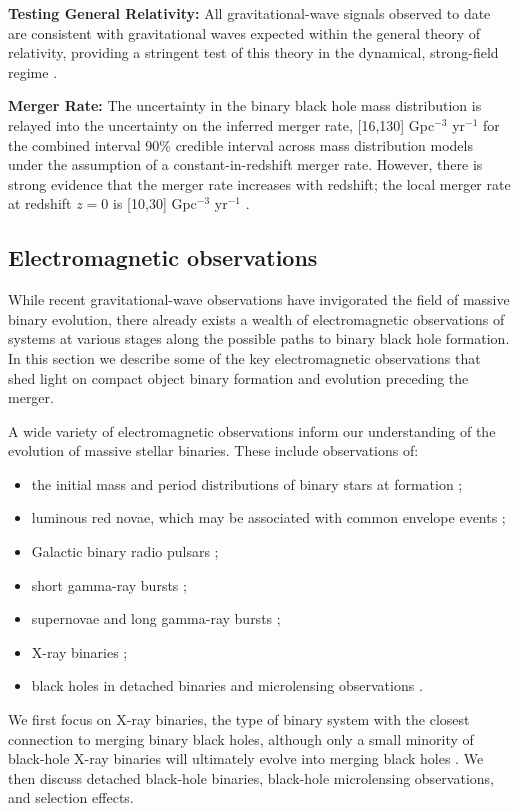 \documentclass[review]{elsarticle}
\begin{document}
\textbf{Testing General Relativity:} All gravitational-wave signals observed to date are consistent with gravitational waves expected within the general theory of relativity, providing a stringent test of this theory in the dynamical, strong-field regime \citep{GW150914:GR,GWTC2:GR}.

\textbf{Merger Rate:} The uncertainty in the binary black hole mass distribution is relayed into the uncertainty on the inferred merger rate, [16,130]  Gpc$^{-3}$ yr$^{-1}$ for the combined interval 90\% credible interval across mass distribution models under the assumption of a constant-in-redshift merger rate.  However, there is strong evidence that the merger rate increases with redshift; the local merger rate at redshift $z=0$ is [10,30]  Gpc$^{-3}$ yr$^{-1}$  \citep{GWTC3:pop}.  

\subsection{Electromagnetic observations}

While recent gravitational-wave observations have invigorated the field of massive binary evolution, there already exists a wealth of electromagnetic observations of systems at various stages along the possible paths to binary black hole formation. In this section we describe some of the key electromagnetic observations that shed light on compact object binary formation and evolution preceding the merger.

A wide variety of electromagnetic observations inform our understanding of the evolution of massive stellar binaries. These include observations of: 
\begin{itemize}
\item the initial mass and period distributions of binary stars at formation \citep[e.g.,][]{Sana:2012,MoeDiStefano:2017}; 
\item luminous red novae, which may be associated with common envelope events \citep[e.g.,][]{Ivanova:2013LRN,Howitt:2020};
\item Galactic binary radio pulsars \citep[e.g.,][]{Tauris:2017};
\item short gamma-ray bursts \citep[e.g.,][]{Berger:2014};
\item supernovae and long gamma-ray bursts \citep[e.g.,][]{Cantiello:2007,Szecsi:2017,Bavera:2021};
\item X-ray binaries \citep[e.g.,][]{TaurisvdH:2006,Fabbiano:2006};
\item black holes in detached binaries \citep[e.g.,][]{Thompson:2019} and microlensing observations \citep[e.g.,][]{WyrzykowskiMandel:2019}.
\end{itemize}
We first focus on X-ray binaries, the type of binary system with the closest connection to merging binary black holes, although only a small minority of black-hole X-ray binaries will ultimately evolve into merging black holes \citep[e.g.,][]{CygnusX3:2012,Neijssel:2020CygX1}. We then discuss detached black-hole binaries, black-hole microlensing observations, and selection effects.
\end{document}
